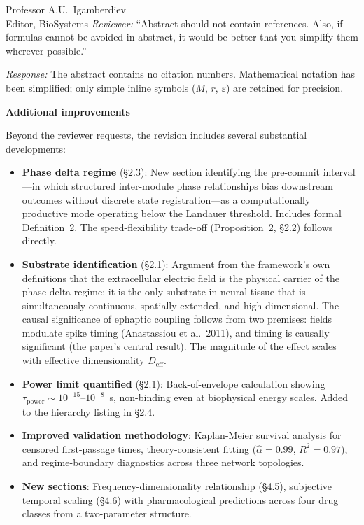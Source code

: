 \documentclass[12pt]{letter}
\begin{document}
\begin{letter}{Professor A.U.\ Igamberdiev\\Editor, BioSystems}
\medskip
\textit{Reviewer:} ``Abstract should not contain references. Also, if formulas cannot be avoided in abstract, it would be better that you simplify them wherever possible.''

\textit{Response:} The abstract contains no citation numbers. Mathematical notation has been simplified; only simple inline symbols ($M$, $r$, $\varepsilon$) are retained for precision.

\medskip
\textbf{Additional improvements}

\medskip
Beyond the reviewer requests, the revision includes several substantial developments:

\begin{itemize}
\item \textbf{Phase delta regime} (\S2.3): New section identifying the pre-commit interval---in which structured inter-module phase relationships bias downstream outcomes without discrete state registration---as a computationally productive mode operating below the Landauer threshold. Includes formal Definition~2. The speed-flexibility trade-off (Proposition~2, \S2.2) follows directly.

\item \textbf{Substrate identification} (\S2.1): Argument from the framework's own definitions that the extracellular electric field is the physical carrier of the phase delta regime: it is the only substrate in neural tissue that is simultaneously continuous, spatially extended, and high-dimensional. The causal significance of ephaptic coupling follows from two premises: fields modulate spike timing (Anastassiou et al.\ 2011), and timing is causally significant (the paper's central result). The magnitude of the effect scales with effective dimensionality $D_{\mathrm{eff}}$.

\item \textbf{Power limit quantified} (\S2.1): Back-of-envelope calculation showing $\tau_{\mathrm{power}} \sim 10^{-15}$--$10^{-8}$~s, non-binding even at biophysical energy scales. Added to the hierarchy listing in \S2.4.

\item \textbf{Improved validation methodology}: Kaplan-Meier survival analysis for censored first-passage times, theory-consistent fitting ($\hat{\alpha} = 0.99$, $R^2 = 0.97$), and regime-boundary diagnostics across three network topologies.

\item \textbf{New sections}: Frequency-dimensionality relationship (\S4.5), subjective temporal scaling (\S4.6) with pharmacological predictions across four drug classes from a two-parameter structure.


\end{itemize}
\end{letter}
\end{document}
